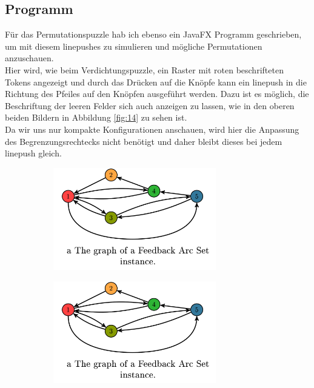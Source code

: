 \documentclass[seminar,german]{algothesis}
\begin{document}
\subsection{Programm}
Für das Permutationspuzzle hab ich ebenso ein JavaFX Programm geschrieben, um mit diesem linepushes zu simulieren und mögliche Permutationen anzuschauen.\\
Hier wird, wie beim Verdichtungspuzzle, ein Raster mit roten beschrifteten Tokens angezeigt und durch das Drücken auf die Knöpfe kann ein linepush in die Richtung des Pfeiles auf den Knöpfen ausgeführt werden. Dazu ist es möglich, die Beschriftung der leeren Felder sich auch anzeigen zu lassen, wie in den oberen beiden Bildern in Abbildung \ref{fig:14} zu sehen ist.\\
 Da wir uns nur kompakte Konfigurationen anschauen, wird hier die Anpassung des Begrenzungsrechtecks nicht benötigt und daher bleibt dieses bei jedem linepush gleich.
\begin{figure}[ht]
	\centering
	\begin{subfigure}{.4\textwidth}
		\includegraphics[width=0.78\textwidth]{graph}
    \end{subfigure}%
    \begin{subfigure}{.4\textwidth}
		\includegraphics[width=0.78\textwidth]{graph}
    \end{subfigure}
\end{figure}
\end{document}
